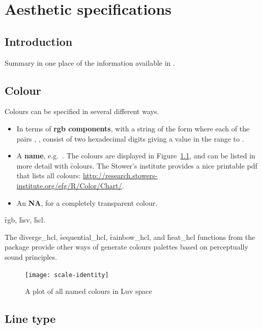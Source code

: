 

\chapter{Aesthetic specifications}
\label{cha:aesthetic_specifications}

\section{Introduction}

Summary in one place of the information available in .

\section{Colour}
\label{sec:colour_spec}

Colours can be specified in several different ways. 

\begin{itemize}
  \item In terms of {\bf rgb components}, with a string of the form  where each of the pairs , ,  consist of two hexadecimal digits giving a value in the range  to . 

  \item A {\bf name}, e.g.\ . The colours are displayed in Figure~\ref{fig:colours}, and can be listed in more detail with \f{colours}. The Stower's institute provides a nice printable pdf that lists all colours:  \url{http://research.stowers-institute.org/efg/R/Color/Chart/}.
    
  \item An {\bf NA}, for a completely transparent colour.  
\end{itemize}

\f{rgb}, \f{hsv}, \f{hcl}.  

The \f{diverge_hcl}, \f{sequential_hcl}, \f{rainbow_hcl}, and \f{heat_hcl} functions from the  package provide other ways of generate colours palettes based on perceptually sound principles.

\begin{figure}[htbp]
  \centering
    \texttt{[image: scale-identity]}
  \caption{A plot of all named colours in Luv space}
  \label{fig:colours}
\end{figure}


\section{Line type}
\label{sec:line_type_spec}


